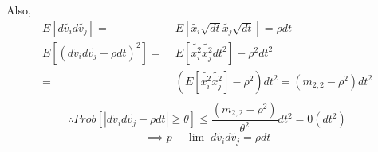 \documentclass[
14pt,notheorems,hyperref={pdfauthor=whatever}
]{beamer}
\begin{document}
\begin{frame}
Also,\\
\begin{align*}
    E[d\tilde{v_i}d\tilde{v_j}] =&\; E[\tilde{x_i}\sqrt{dt}\tilde{x_j}\sqrt{dt}] = \rho dt\\
    E[(d\tilde{v_i}d\tilde{v_j}-\rho dt)^2] =&\; E[\tilde{x_i^2}\tilde{x_j^2}dt^2]-\rho^2 dt^2\\
    =&\; (E[\tilde{x_i^2}\tilde{x_j^2}]-\rho^2) dt^2 = (m_{2,2}-\rho^2)dt^2\\
\end{align*}
\[\therefore Prob[|d\tilde{v_i}d\tilde{v_j} - \rho dt| \geq \theta] \leq \frac{(m_{2,2}-\rho^2)}{\theta^2}dt^2 = 0(dt^2)\]
\[\implies {p\!\!-\!\!\lim}\; d\tilde{v_i}d\tilde{v_j} = \rho dt\]
\end{frame}




\end{document}
